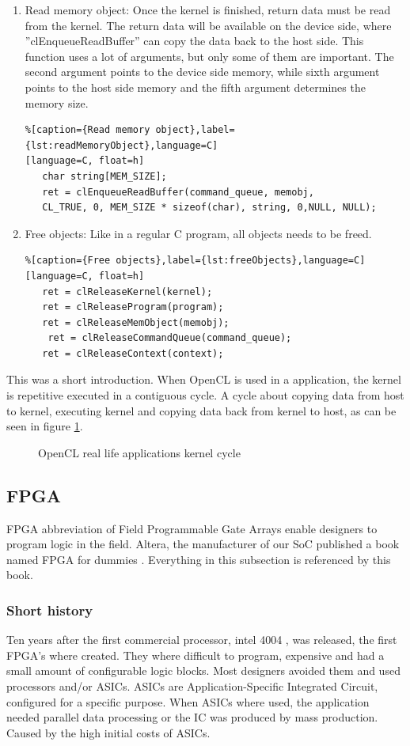 \documentclass[12pt,a4paper,english,twoside,openright]{tutthesis}
\begin{document}
\begin{enumerate}
	\item Read memory object:	Once the kernel is finished, return data must be read from the kernel. The return data will be available on the device side, where ''clEnqueueReadBuffer'' can copy the data back to the host side. This function uses a lot of arguments, but only some of them are important. The second argument points to the device side memory, while sixth argument points to the host side memory and the fifth argument determines the memory size.
\begin{lstlisting}%[caption={Read memory object},label={lst:readMemoryObject},language=C]
[language=C, float=h]
   char string[MEM_SIZE];
   ret = clEnqueueReadBuffer(command_queue, memobj,
   CL_TRUE, 0, MEM_SIZE * sizeof(char), string, 0,NULL, NULL);
\end{lstlisting}

	\item Free objects:	Like in a regular C program, all objects needs to be freed.
\begin{lstlisting}%[caption={Free objects},label={lst:freeObjects},language=C]
[language=C, float=h]
   ret = clReleaseKernel(kernel);
   ret = clReleaseProgram(program);
   ret = clReleaseMemObject(memobj);
    ret = clReleaseCommandQueue(command_queue);
   ret = clReleaseContext(context);
\end{lstlisting}
\end{enumerate}
This was a short introduction. When OpenCL is used in a application, the kernel is repetitive executed in a contiguous cycle. A cycle about copying data from host to kernel, executing kernel and copying data back from kernel to host, as can be seen in figure \ref{fig:OpenCLApplicationCycle}. 

\begin{figure}\centering
	
	\caption{OpenCL real life applications kernel cycle}\label{fig:OpenCLApplicationCycle}
\end{figure}
		\subsection{FPGA}
FPGA abbreviation of Field Programmable Gate Arrays enable designers to program logic in the field. Altera, the manufacturer of our SoC published a book named FPGA for dummies \cite{FPGAforDummies}. Everything in this subsection is referenced by this book.

			\subsubsection{Short history}
Ten years after the first commercial processor, intel 4004 \cite{intel4004}, was released, the first FPGA's where created. They where difficult to program, expensive and had a small amount of configurable logic blocks. Most designers avoided them and used processors and/or ASICs. ASICs are Application-Specific Integrated Circuit, configured for a specific purpose. When ASICs where used, the application needed parallel data processing or the IC was produced by mass production. Caused by the high initial costs of ASICs.
\end{document}
